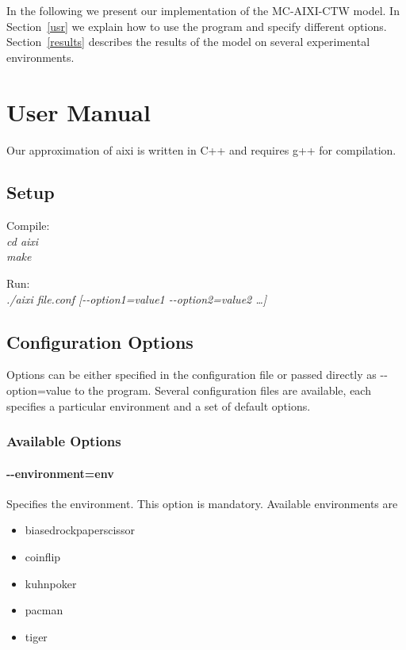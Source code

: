 \documentclass[paper=a4, fontsize=11pt]{scrartcl} %
\numberwithin{equation}{section} %
\numberwithin{figure}{section} %
\numberwithin{table}{section} %
\begin{document}
In the following we present our implementation of the MC-AIXI-CTW model. In Section~\ref{usr} we explain how to use the program and specify different options. Section~\ref{results} describes the results of the model on several experimental environments.


\section{\label{usr}User Manual}

Our approximation of aixi is written in C++ and requires g++ for compilation.

\subsection{Setup}

\setlength\parindent{20pt}
\noindent Compile:\\
\indent \textit{cd aixi}\\
\indent \textit{make}

\bigskip

\noindent Run:\\
\indent \textit{./aixi file.conf [-{}-option1=value1 -{}-option2=value2 \dots]}
\setlength\parindent{0pt}


\subsection{Configuration Options}

Options can be either specified in the configuration file or passed directly as -{}-option=value to the program. Several configuration files are available, each specifies a particular environment and a set of default options. 

\subsubsection*{Available Options}

\paragraph{-{}-environment=env} Specifies the environment. This option is mandatory. Available environments are
\begin{itemize}
\itemsep0pt
\renewcommand\labelitemi{--}
    \item biased\textunderscore rock\textunderscore paper\textunderscore scissor
    \item coinflip
    \item kuhn\textunderscore poker
    \item pacman
    \item tiger
\end{itemize}
\end{document}
